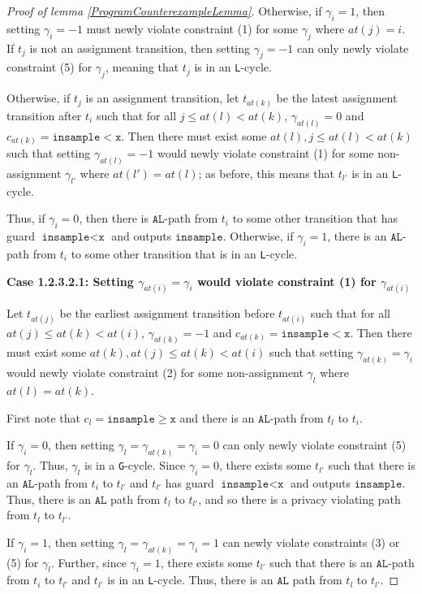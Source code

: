 \documentclass[12pt]{article}
\newcommand{\gguard}[1][x]{\texttt{insample}\geq#1}
\newcommand{\lguard}[1][x]{\texttt{insample} < #1}
\newcommand{\gcycle}{\texttt{G}-cycle}
\newcommand{\lcycle}{\texttt{L}-cycle}
\theoremstyle{definition}
\begin{document}
\begin{proof}[Proof of lemma \ref{ProgramCounterexampleLemma}]
    Otherwise, if $\gamma_i = 1$, then setting $\gamma_i = -1$ must newly violate constraint (1) for some $\gamma_j$ where $at(j) = i$. If $t_{j}$ is not an assignment transition, then setting $\gamma_{j} = -1$ can only newly violate constraint (5) for $\gamma_{j}$, meaning that $t_j$ is in an \lcycle. 

    Otherwise, if $t_j$ is an assignment transition, let $t_{at(k)}$ be the latest assignment transition after $t_{i}$ such that for all $j\leq at(l)< at(k)$, $\gamma_{at(l)} =0$ and $c_{at(k)} = \lguard[\texttt{x}]$. Then there must exist some $at(l), j\leq at(l)< at(k)$ such that setting $\gamma_{at(l)}=-1$ would newly violate constraint (1) for some non-assignment $\gamma_{l'}$ where $at(l') = at(l)$; as before, this means that $t_{l'}$ is in an \lcycle.  

    Thus, if $\gamma_i =0$, then there is $\texttt{AL}$-path from $t_i$ to some other transition that has guard $\lguard[\texttt{x}]$ and outputs $\texttt{insample}$. Otherwise, if $\gamma_i = 1$, there is an $\texttt{AL}$-path from $t_i$ to some other transition that is in an \lcycle. 

    \textbf{Case 1.2.3.2.1: Setting $\gamma_{at(i)} = \gamma_i$ would violate constraint (1) for $\gamma_{at(i)}$}

    Let $t_{at(j)}$ be the earliest assignment transition before $t_{at(i)}$ such that for all $at(j)\leq at(k)< at(i)$, $\gamma_{at(k)} =-1$ and $c_{at(k)} = \lguard[\texttt{x}]$. Then there must exist some $at(k), at(j)\leq at(k)< at(i)$ such that setting $\gamma_{at(k)}=\gamma_i$ would newly violate constraint (2) for some non-assignment $\gamma_l$ where $at(l) = at(k)$.

    First note that $c_l = \gguard[\texttt{x}]$ and there is an $\texttt{AL}$-path from $t_l$ to $t_i$. 
    
    If $\gamma_i = 0$, then setting $\gamma_l = \gamma_{at(k)} = \gamma_i = 0$ can only newly violate constraint (5) for $\gamma_l$. Thus, $\gamma_l$ is in a \gcycle. Since $\gamma_i = 0$, there exists some $t_{l'}$ such that there is an $\texttt{AL}$-path from $t_i$ to $t_{l'}$ and $t_{l'}$ has guard $\lguard[\texttt{x}]$ and outputs $\texttt{insample}$. Thus, there is an $\texttt{AL}$ path from $t_l$ to $t_{l'}$, and so there is a privacy violating path from $t_l$ to $t_{l'}$. 
    
    If $\gamma_i = 1$, then setting $\gamma_l = \gamma_{at(k)} = \gamma_i = 1$ can newly violate constraints (3) or (5) for $\gamma_l$. Further, since $\gamma_i =1$, there exists some $t_{l'}$ such that there is an $\texttt{AL}$-path from $t_i$ to $t_{l'}$ and $t_{l'}$ is in an \lcycle. Thus, there is an $\texttt{AL}$ path from $t_l$ to $t_{l'}$.
    

\end{proof}
\end{document}
